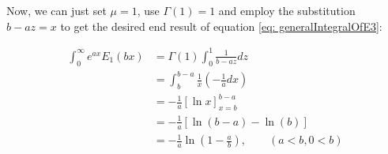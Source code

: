 \documentclass[bibliography=totocnumbered]{scrartcl}
\newcommand{\assume}[1][\text{MISSING PARAMETER}]{,\qquad\left(#1\right)}
\begin{document}
			Now, we can just set $\mu=1$, use $\Gamma\left(1\right)=1$ and employ the substitution $b-az=x$ to get the desired end result of equation \eqref{eq: generalIntegralOfE3}:
			
			\begin{align}
			\int_{0}^{\infty}e^{ax}E_1\left(bx\right)&=\Gamma\left(1\right)\int_{0}^{1}\frac{1}{b-az}dz\\
			&=\int_{b}^{b-a}\frac{1}{x}\left(-\frac{1}{a}dx\right)\\
			&=-\frac{1}{a}\left[\ln{x}\right]^{b-a}_{x=b}\\
			&=-\frac{1}{a}\left[\ln{\left(b-a\right)}-\ln{\left(b\right)}\right]\\
			&=-\frac{1}{a}\ln{\left(1-\frac{a}{b}\right)}\assume[a<b, 0<b]
			\end{align}
\end{document}
